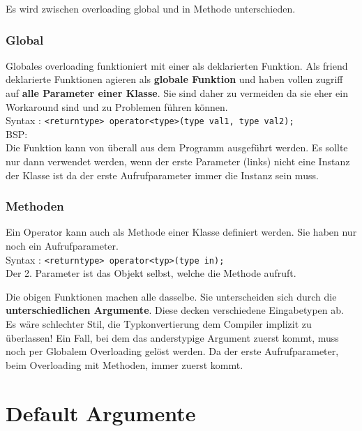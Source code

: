 Es wird zwischen overloading global und in Methode unterschieden.

\subsubsection{Global}

Globales overloading funktioniert mit einer als  deklarierten Funktion. 
Als friend deklarierte Funktionen agieren als \textbf{globale Funktion} und haben vollen zugriff auf \textbf{alle Parameter einer Klasse}. 
Sie sind daher zu vermeiden da sie eher ein Workaround sind und zu Problemen führen können.\\ 

Syntax : \verb|<returntype> operator<type>(type val1, type val2);|\\
BSP:\\



Die Funktion kann von überall aus dem Programm ausgeführt werden. 
Es sollte nur dann verwendet werden, wenn der erste Parameter (links) nicht eine Instanz der Klasse ist da der erste Aufrufparameter immer die Instanz sein muss.  

\subsubsection{Methoden}

Ein Operator kann auch als Methode einer Klasse definiert werden. 
Sie haben nur noch ein Aufrufparameter.\\
Syntax : \verb|<returntype> operator<typ>(type in);|\\
Der 2. Parameter ist das Objekt selbst, welche die Methode aufruft.



Die obigen Funktionen machen alle dasselbe. 
Sie unterscheiden sich durch die \textbf{unterschiedlichen Argumente}. 
Diese decken verschiedene Eingabetypen ab. 
Es wäre schlechter Stil, die Typkonvertierung dem Compiler implizit zu überlassen! 
Ein Fall, bei dem das anderstypige Argument zuerst kommt, muss noch per Globalem Overloading gelöst werden. 
Da der erste Aufrufparameter, beim Overloading mit Methoden, immer zuerst kommt. 
 
\section{Default Argumente}

